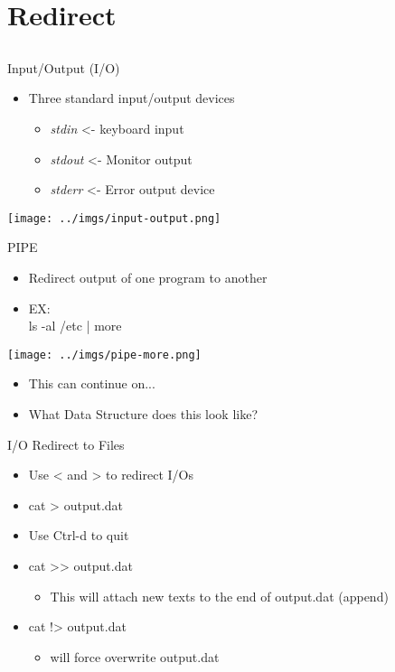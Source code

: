 \documentclass{beamer}
\begin{document}
\section{Redirect}
\subsection{}
\begin{frame}{Input/Output (I/O)}
\begin{itemize}
\item Three standard input/output devices
\begin{itemize}
\item \textit{stdin} <- keyboard input
\item \textit{stdout} <- Monitor output
\item \textit{stderr} <- Error output device
\end{itemize}
\end{itemize}
\texttt{[image: ../imgs/input-output.png]}
\end{frame}

\begin{frame}{PIPE}
\begin{itemize}
\item Redirect output of one program to another
\item EX: \\
ls -al /etc | more
\end{itemize}
\texttt{[image: ../imgs/pipe-more.png]} \\
\begin{itemize}
\item This can continue on...
\item What Data Structure does this look like?
\end{itemize}
\end{frame}

\begin{frame}{I/O Redirect to Files}
\begin{itemize}
\item Use < and > to redirect I/Os
\item cat > output.dat
\item Use Ctrl-d to quit
\item cat >> output.dat
\begin{itemize}
\item This will attach new texts to the end of output.dat (append)
\end{itemize}
\item cat !> output.dat
\begin{itemize}
\item will force overwrite output.dat
\end{itemize}
\end{itemize}
\end{frame}
\end{document}
